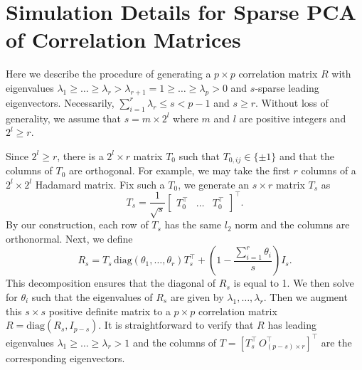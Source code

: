 \documentclass[11pt]{article}
\newcommand{\nb}[1]{\textcolor{orange}{\texttt{[#1]}}}
\newcommand{\0}{{\mathbf{0}}}
\begin{document}
\section{Simulation Details for Sparse PCA of Correlation Matrices}
\label{sec:simu-pca-detail}


Here we describe the procedure of generating a $p\times p$ correlation matrix $R$ with eigenvalues $\lambda_1\geq \dots\geq \lambda_r > \lambda_{r+1} = 1 \geq \dots \geq \lambda_p > 0$ and $s$-sparse leading eigenvectors. 
Necessarily, $\sum_{i=1}^r\lambda_r \leq s < p-1$ and $s\geq r$. 
Without loss of generality, we assume that $s = m \times 2^l$ where $m$ and $l$ are positive integers and $2^l\geq r$.

Since $2^l\geq r$, there is a $2^l \times r$ matrix $T_0$ such that $T_{0, ij}\in \{\pm 1\}$ and that the columns of $T_0$ are orthogonal.
For example, we may take the first $r$ columns of a $2^l\times 2^l$ Hadamard matrix.
Fix such a $T_0$, we generate an $s\times r$ matrix $T_s$ as
\begin{equation*}
	T_s = \frac{1}{\sqrt{s}}
	\begin{bmatrix}
		T_0^\top & \dots & T_0^\top
	\end{bmatrix}^\top.
\end{equation*}
By our construction, each row of $T_s$ has the same $l_2$ norm and the columns are orthonormal.
Next, we define
\begin{equation*}
	R_s = T_s\, \mathrm{diag}(\theta_1,\dots,\theta_r) T_s^\top + 
	\left(1 - \frac{\sum_{i=1}^r\theta_i}{s}\right) I_s.
\end{equation*}
This decomposition ensures that the diagonal of $R_s$ is equal to 1. We then solve for $\theta_i$ such that the eigenvalues of $R_s$ are given by $\lambda_1, \dots, \lambda_r.$
Then we augment this $s\times s$ positive definite matrix to a $p\times p$ correlation matrix $R = \mathrm{diag}(R_s, I_{p-s})$.
It is straightforward to verify that $R$ has leading eigenvalues $\lambda_1 \geq \dots \geq \lambda_r > 1$ and the columns of $T = [T_s^\top\, O_{(p-s)\times r}^\top]^\top$ are the corresponding eigenvectors.
\end{document}
